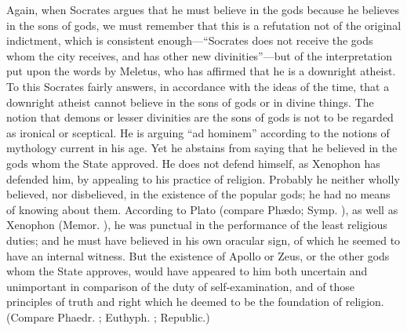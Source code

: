 \documentclass[11pt,letter]{article}
\begin{document}
\par  Again, when Socrates argues that he must believe in the gods because he believes in the sons of gods, we must remember that this is a refutation not of the original indictment, which is consistent enough—“Socrates does not receive the gods whom the city receives, and has other new divinities”—but of the interpretation put upon the words by Meletus, who has affirmed that he is a downright atheist. To this Socrates fairly answers, in accordance with the ideas of the time, that a downright atheist cannot believe in the sons of gods or in divine things. The notion that demons or lesser divinities are the sons of gods is not to be regarded as ironical or sceptical. He is arguing “ad hominem” according to the notions of mythology current in his age. Yet he abstains from saying that he believed in the gods whom the State approved. He does not defend himself, as Xenophon has defended him, by appealing to his practice of religion. Probably he neither wholly believed, nor disbelieved, in the existence of the popular gods; he had no means of knowing about them. According to Plato (compare Phædo; Symp. ), as well as Xenophon (Memor. ), he was punctual in the performance of the least religious duties; and he must have believed in his own oracular sign, of which he seemed to have an internal witness. But the existence of Apollo or Zeus, or the other gods whom the State approves, would have appeared to him both uncertain and unimportant in comparison of the duty of self-examination, and of those principles of truth and right which he deemed to be the foundation of religion. (Compare Phaedr. ; Euthyph. ; Republic.)
\end{document}

